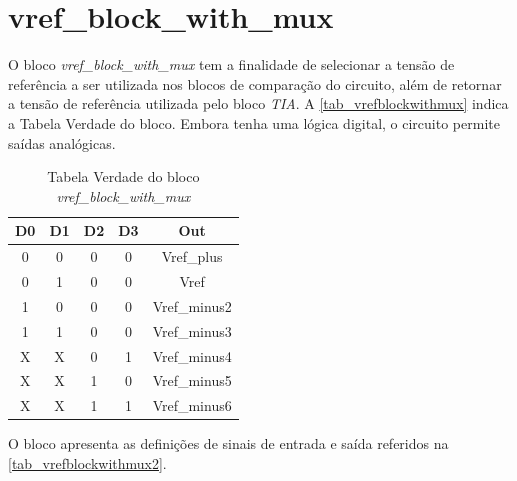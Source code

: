 \renewcommand{\NomeBloco}{\textit{vref\_block\_with\_mux}}
\renewcommand{\NomeBlocoA}{vrefblockwithmux}
\renewcommand{\NomePTab}{tab_\NomeBlocoA}
\renewcommand{\NomeSTab}{tab_\NomeBlocoA2}
\renewcommand{\NomePFig}{fig_\NomeBlocoA}
\renewcommand{\NomeSFig}{fig_\NomeBlocoA2}
\renewcommand{\NomeTTab}{tab_\NomeBlocoA3}

\section{vref\_block\_with\_mux}

O bloco \NomeBloco{} tem a finalidade de selecionar a tensão de refer\^encia a ser utilizada nos blocos de comparação do circuito, al\'em de retornar a tensão de refer\^encia utilizada pelo bloco \textit{TIA}. A \autoref{\NomePTab} indica a Tabela Verdade do bloco. Embora tenha uma l\'ogica digital, o circuito permite sa\'idas anal\'ogicas.

\begin{table}[htbp]

\caption{Tabela Verdade do bloco \NomeBloco}%
\label{\NomePTab}
\centering
\begin{tabular}{ccccc}
    \toprule
    D0 & D1 & D2 & D3 & Out \\
    \midrule \midrule
    0 & 0 & 0 & 0 & Vref\_plus\\
    \midrule
    0 & 1 & 0 & 0 & Vref\\
    \midrule
    1 & 0 & 0 & 0 & Vref\_minus2\\
    \midrule
    1 & 1 & 0 & 0 & Vref\_minus3\\
    \midrule
    X & X & 0 & 1 & Vref\_minus4\\
    \midrule
    X & X & 1 & 0 & Vref\_minus5\\
    \midrule
    X & X & 1 & 1 & Vref\_minus6\\
\bottomrule

\end{tabular}
\end{table}

O bloco apresenta as definições de sinais de entrada e sa\'ida referidos na \autoref{\NomeSTab}.

